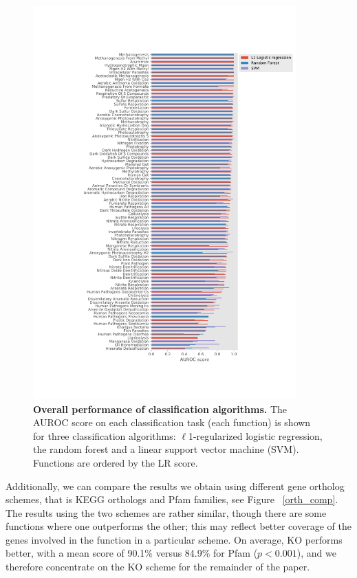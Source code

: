 \documentclass[10pt,letterpaper]{article}
\begin{document}
\begin{figure}[!h]
\includegraphics[width=0.9\textwidth]{fig1}
\caption{{\bf Overall performance of classification algorithms.}
The AUROC score on each classification task (each function) is shown for three classification algorithms: $\ell$1-regularized logistic regression, the random forest and a linear support vector machine (SVM). Functions are ordered by the LR score.}
\label{fig1}
\end{figure}


Additionally, we can compare the results we obtain using different gene ortholog schemes, that is KEGG orthologs and Pfam families, see Figure ~\ref{orth_comp}. The results using the two schemes are rather similar, though there are some functions where one outperforms the other; this may reflect better coverage of the genes involved in the function in a particular scheme. On average, KO performs better, with a mean score of 90.1\% versus 84.9\% for Pfam ($p<0.001$), and we therefore concentrate on the KO scheme for the remainder of the paper.
\end{document}
